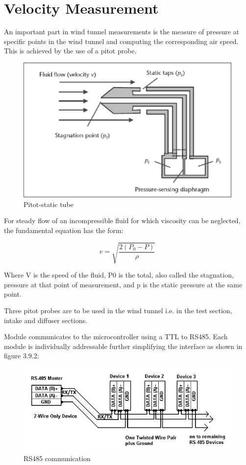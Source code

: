 \section{Velocity Measurement}
An important part in wind tunnel measurements is the measure of pressure at specific points in the wind tunnel and computing the corresponding air speed. This is achieved by the use of a pitot probe. 
\begin{center}
\begin{figure}[H]
\centering
\includegraphics[width=0.6\linewidth]{Figures/pitot}
\caption[Pitot-static tube]{Pitot-static tube \cite{viquerat_continuous_2006}}
\end{figure}
\end{center}
For steady flow of an incompressible fluid for which viscosity can be neglected, the fundamental equation has the form:

\begin{equation}
	v = \sqrt{\frac{2(P_{0} - P)}{\rho}}
\end{equation}

Where V is the speed of the fluid, P0 is the total, also called the stagnation, pressure at that point of measurement, and p is the static pressure at the same point.

Three pitot probes are to be used in the wind tunnel i.e. in the test section, intake and diffuser sections.

Module communicates to the microcontroller using a TTL to RS485. Each module is individually addressable further simplifying the interface as shown in figure 3.9.2:
\begin{center}
\begin{figure}[H]
\centering
\includegraphics{Figures/modbus}
\caption[RS485 communication]{RS485 communication}
\end{figure}
\end{center}

